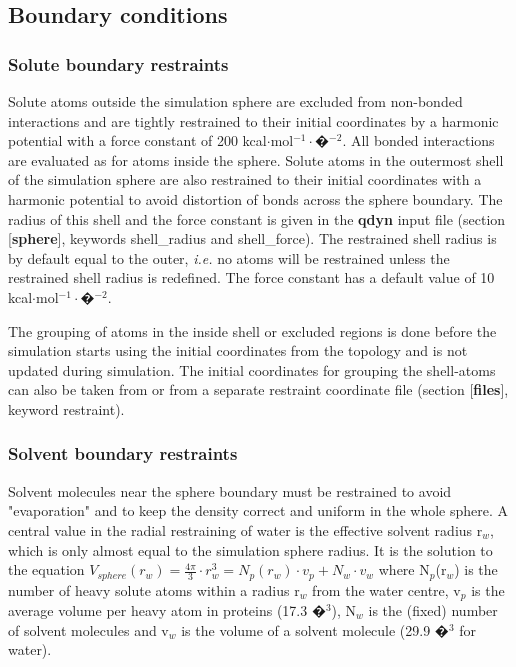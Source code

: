 \documentclass[a4paper,10pt]{article}
\begin{document}

\subsection{Boundary conditions}
\label{subsec:boundary}
\subsubsection{Solute boundary restraints}

\label{subsubsec:soluteboundary} Solute  atoms outside  the simulation
sphere  are  excluded from  non-bonded  interactions  and are  tightly
restrained to their initial coordinates by a harmonic potential with a
force constant  of 200 kcal$\cdot$mol$^{-1}\cdot$�$^{-2}$.  All bonded
interactions  are evaluated  as for  atoms inside  the sphere.  Solute
atoms  in  the outermost  shell  of  the  simulation sphere  are  also
restrained to their  initial coordinates with a  harmonic potential to
avoid distortion  of bonds across  the sphere boundary. The  radius of
this shell and the force constant  is given in the \textbf{qdyn} input
file   (section   [\textbf{sphere}],    keywords   shell\_radius   and
shell\_force). The restrained shell radius  is by default equal to the
outer, \emph{i.e.} no  atoms will be restrained  unless the restrained
shell radius is  redefined. The force constant has a  default value of
10 kcal$\cdot$mol$^{-1}\cdot$�$^{-2}$.

The grouping of atoms in the inside shell or excluded regions is
done before the simulation starts using the initial coordinates
from the topology and is not updated during simulation. The
initial coordinates for grouping the shell-atoms can also be taken
from or from a separate restraint coordinate file (section
[\textbf{files}], keyword restraint).

\subsubsection{Solvent boundary restraints}
\label{subsubsec:solventboundary}


Solvent molecules near the sphere boundary must be restrained to
avoid "evaporation" and to keep the density correct and uniform in
the whole sphere. A central value in the radial restraining of
water is the effective solvent radius r$_w$, which is only almost
equal to the simulation sphere radius. It is the solution to the
equation $V_{sphere} \left(r_w\right) = \frac{4\pi}{3}\cdot r_w^3
= N_p\left(r_w\right)\cdot v_p+N_w\cdot v_w $ where N$_p$(r$_w$)
is the number of heavy solute atoms within a radius r$_w$ from the
water centre, v$_p$ is the average volume per heavy atom in
proteins (17.3 �$^3$), N$_w$ is the (fixed) number of solvent
molecules and v$_w$ is the volume of a solvent molecule (29.9
�$^3$ for water).
\end{document}
